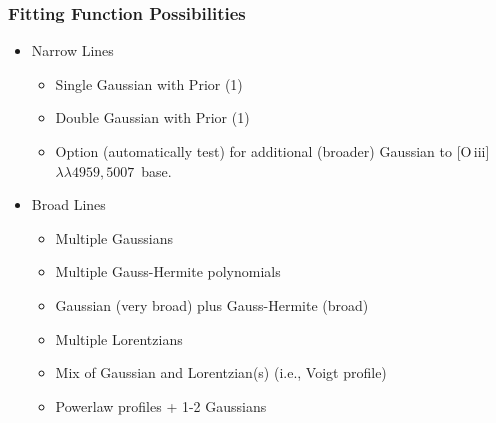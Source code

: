 \documentclass[12pt,letterpaper]{article}
\newcommand{\ob}{[O\,{\sc iii}]\,$\lambda \lambda 4959,5007$}
\begin{document}
\subsubsection*{Fitting Function Possibilities}

  \begin{itemize}
    \item Narrow Lines
      \begin{itemize}
        \item Single Gaussian with Prior (1) 
	\item Double Gaussian with Prior (1)  
        \item Option (automatically test) for additional (broader) Gaussian to \ob\ base. 
      \end{itemize}
    \item Broad Lines
      \begin{itemize}
        \item Multiple Gaussians
        \item Multiple Gauss-Hermite polynomials
        \item Gaussian (very broad) plus Gauss-Hermite (broad)
        \item Multiple Lorentzians
        \item Mix of Gaussian and Lorentzian(s) (i.e., Voigt profile)
	\item Powerlaw profiles + 1-2 Gaussians 
      \end{itemize}
   \end{itemize}
\end{document}
